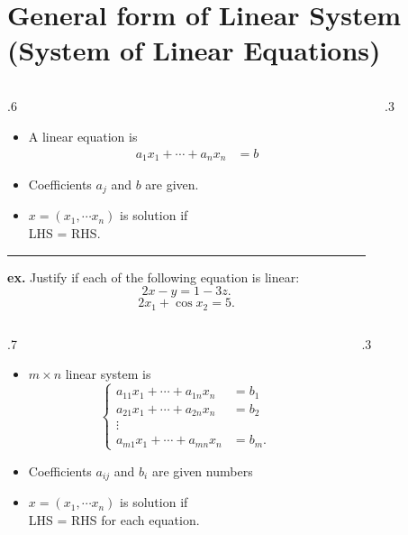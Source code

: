 \documentclass{beamer}
\theoremstyle{definition}
\theoremstyle{theorem}
\begin{document}
\section{General form of Linear System (System of Linear Equations)}
\begin{frame}
\begin{columns}
\begin{column}
 {.6\textwidth}
 \begin{itemize}
 \item A linear equation is
\begin{equation*}
 \label{eq:02}
\begin{array}
 {ll}
 a_{1} x_{1} + \cdots + a_{n} x_{n} &= b
\end{array}
\end{equation*}
\item Coefficients $a_{j}$ and $b$ are given.
\item $x = (x_{1}, \cdots x_{n})$ is solution if \\LHS = RHS.
\end{itemize}
\hrule
\vspace{.2in}
{\tiny
{\bf ex.} Justify if each of the following equation is linear:
$$2x - y = 1-3z.$$
$$ 2 x_{1} + \cos x_{2} = 5.$$
}
\end{column}
\begin{column}
 {.3\textwidth}
\end{column}
\end{columns}
\end{frame}



\begin{frame}
\begin{columns}
\begin{column}
 {.7\textwidth}
 \begin{itemize}
 \item $m\times n$ linear system is 
\begin{equation*}
 \label{eq:02}
\left\{
\begin{array}
 {ll}
 a_{11} x_{1} + \cdots + a_{1n} x_{n} &= b_{1} \\
 a_{21} x_{1} + \cdots + a_{2n} x_{n} &= b_{2} \\
 \vdots \\
 a_{m1} x_{1} + \cdots + a_{mn} x_{n} &= b_{m}.
\end{array}
\right.
\end{equation*}
\item Coefficients $a_{ij}$ and $b_{i}$ are given numbers
\item $x = (x_{1}, \cdots x_{n})$ is solution if \\
LHS = RHS for each equation.
\end{itemize}

\end{column}
\begin{column}
 {.3\textwidth}
\end{column}
\end{columns}

 
\end{frame}
\end{document}
